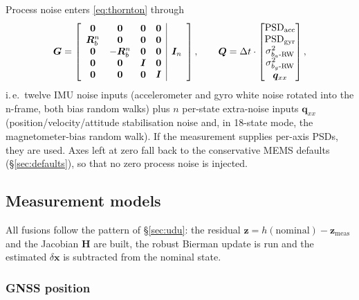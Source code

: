 \documentclass[11pt,a4paper]{article}
\newcommand{\vect}[1]{\bm{#1}}
\newcommand{\mat}[1]{\bm{#1}}
\newcommand{\nframe}{n}
\newcommand{\bframe}{b}
\newcommand{\Rbn}{\mat{R}_{\bframe}^{\nframe}}
\newcommand{\dt}{\Delta t}
\begin{document}
Process noise enters \eqref{eq:thornton} through
\begin{equation}
  \mat{G} =
  \left[
  \begin{array}{cccc|c}
    \mat{0} & \mat{0} & \mat{0} & \mat{0} & \multirow{5}{*}{$\mat{I}_{n}$} \\
    \Rbn & \mat{0} & \mat{0} & \mat{0} & \\
    \mat{0} & -\Rbn & \mat{0} & \mat{0} & \\
    \mat{0} & \mat{0} & \mat{I} & \mat{0} & \\
    \mat{0} & \mat{0} & \mat{0} & \mat{I} &
  \end{array}
  \right],
  \qquad
  \vect{Q} = \dt \cdot
  \begin{bmatrix}
    \text{PSD}_{\text{acc}} \\
    \text{PSD}_{\text{gyr}} \\
    \sigma^2_{b_a\text{-RW}} \\
    \sigma^2_{b_g\text{-RW}} \\
    \vect{q}_{xx}
  \end{bmatrix},
\end{equation}
i.\,e.\ twelve IMU noise inputs (accelerometer and gyro white noise
rotated into the n-frame, both bias random walks) plus $n$ per-state
extra-noise inputs $\vect{q}_{xx}$ (position/velocity/attitude
stabilisation noise and, in 18-state mode, the magnetometer-bias random
walk). If the measurement supplies per-axis PSDs, they are used.
Axes left at zero fall back to the conservative MEMS defaults
(\S\ref{sec:defaults}), so that no zero process noise is injected.

\subsection{Measurement models}

All fusions follow the pattern of \S\ref{sec:udu}: the residual
$\vect{z} = h(\text{nominal}) - \vect{z}_{\text{meas}}$ and the Jacobian
$\mat{H}$ are built, the robust Bierman update is run and the estimated
$\delta\vect{x}$ is subtracted from the nominal state.

\subsubsection{GNSS position}
\label{sec:gnss-pos}
\end{document}
